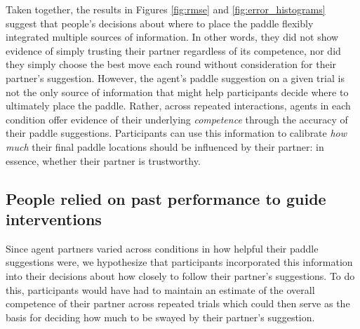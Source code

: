 \documentclass[10pt,letterpaper]{article}
\begin{document}
Taken together, the results in Figures \ref{fig:rmse} and \ref{fig:error_histograms} suggest that people's decisions about where to place the paddle flexibly integrated multiple sources of information. In other words, they did not show evidence of simply trusting their partner regardless of its competence, nor did they simply choose the best move each round without consideration for their partner's suggestion. However, the agent's paddle suggestion on a given trial is not the only source of information that might help participants decide where to ultimately place the paddle. Rather, across repeated interactions, agents in each condition offer evidence of their underlying \textit{competence} through the accuracy of their paddle suggestions. Participants can use this information to calibrate \textit{how much} their final paddle locations should be influenced by their partner: in essence, whether their partner is trustworthy. 


\subsection{People relied on past performance to guide interventions}

Since agent partners varied across conditions in how helpful their paddle suggestions were, we hypothesize that participants incorporated this information into their decisions about how closely to follow their partner's suggestions. To do this, participants would have had to maintain an estimate of the overall competence of their partner across repeated trials which could then serve as the basis for deciding how much to be swayed by their partner's suggestion. 
\end{document}
